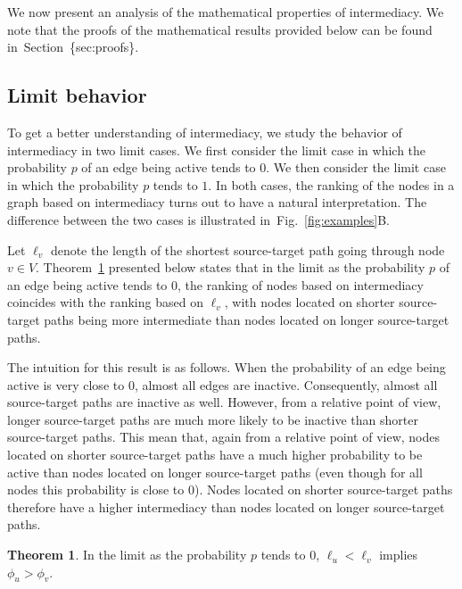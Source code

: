 \documentclass[9pt,twocolumn,twoside,lineno]{pnas-alt}
\theoremstyle{definition}
\newtheorem{theorem}{Theorem}
\newcommand{\secref}[1]{Section~\{sec:#1\}\xspace}
\newcommand{\subfigref}[2]{Fig.~\ref{fig:#1}#2\xspace}
\newcommand{\theref}[1]{Theorem~\ref{the:#1}\xspace}
\begin{document}
We now present an analysis of the mathematical properties of intermediacy. We note that the proofs of the mathematical results provided below can be found in~\secref{proofs}.

%
%

\subsection*{\label{sec:limit}Limit behavior}

To get a better understanding of intermediacy, we study the behavior of intermediacy in two limit cases. We first consider the limit case in which the probability $p$ of an edge being active tends to $0$. We then consider the limit case in which the probability $p$ tends to $1$. In both cases, the ranking of the nodes in a graph based on intermediacy turns out to have a natural interpretation. The difference between the two cases is illustrated in~\subfigref{examples}{B}.

Let $\ell_v$ denote the length of the shortest source-target path going through node $v \in V$. \theref{p0} presented below states that in the limit as the probability $p$ of an edge being active tends to $0$, the ranking of nodes based on intermediacy coincides with the ranking based on $\ell_v$, with nodes located on shorter source-target paths being more intermediate than nodes located on longer source-target paths.

The intuition for this result is as follows. When the probability of an edge being active is very close to $0$, almost all edges are inactive. Consequently, almost all source-target paths are inactive as well. However, from a relative point of view, longer source-target paths are much more likely to be inactive than shorter source-target paths. This mean that, again from a relative point of view, nodes located on shorter source-target paths have a much higher probability to be active than nodes located on longer source-target paths (even though for all nodes this probability is close to $0$). Nodes located on shorter source-target paths therefore have a higher intermediacy than nodes located on longer source-target paths.

\begin{theorem}
    In the limit as the probability $p$ tends to $0$, $\ell_u < \ell_v$ implies $\phi_u > \phi_v$.
    \label{the:p0}
\end{theorem}
\end{document}
